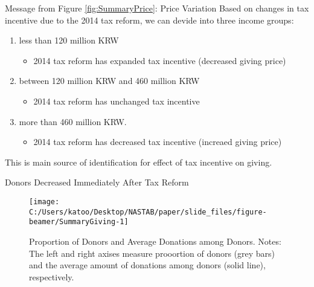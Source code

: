 \documentclass[
  ignorenonframetext,
  aspectratio=169,
]{beamer}
\providecommand{\tightlist}{%
  \setlength{\itemsep}{0pt}\setlength{\parskip}{0pt}}
\begin{document}
\begin{frame}{Message from Figure \ref{fig:SummaryPrice}: Price Variation}
\protect\hypertarget{message-from-figure-reffigsummaryprice-price-variation}{}
Based on changes in tax incentive due to the 2014 tax reform,
we can devide into three income groups:

\begin{enumerate}
\tightlist
\item
  less than 120 million KRW

  \begin{itemize}
  \tightlist
  \item
    2014 tax reform has expanded tax incentive (decreased giving price)
  \end{itemize}
\item
  between 120 million KRW and 460 million KRW

  \begin{itemize}
  \tightlist
  \item
    2014 tax reform has unchanged tax incentive
  \end{itemize}
\item
  more than 460 million KRW.

  \begin{itemize}
  \tightlist
  \item
    2014 tax reform has decreased tax incentive (increaed giving price)
  \end{itemize}
\end{enumerate}

This is main source of identification for effect of tax incentive on giving.
\end{frame}

\begin{frame}{Donors Decreased Immediately After Tax Reform}
\protect\hypertarget{donors-decreased-immediately-after-tax-reform}{}
\begin{figure}[t]

{\centering \texttt{[image: C:/Users/katoo/Desktop/NASTAB/paper/slide\_files/figure-beamer/SummaryGiving-1]} 

}

\caption{Proportion of Donors and Average Donations among Donors. Notes: The left and right axises measure prooortion of donors (grey bars) and the average amount of donations among donors (solid line), respectively.}\label{fig:SummaryGiving}
\end{figure}
\end{frame}
\end{document}
